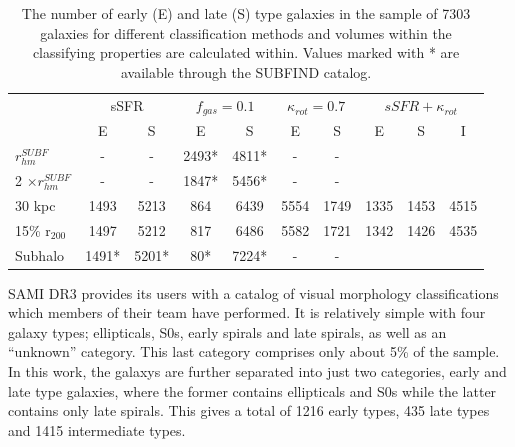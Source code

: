 \begin{table}
\begin{center}
\caption{The number of early (E) and late (S) type galaxies in the sample of 7303 galaxies for different classification methods and volumes within the classifying properties are calculated within. Values marked with * are available through the SUBFIND catalog.}
 \label{morph}
\begin{tabular}{ l| c c c c c c c c c } 
 \hline
 \hline
   &\multicolumn{2}{c}{sSFR}&\multicolumn{2}{c}{$f_{gas} = 0.1$}&\multicolumn{2}{c}{$\kappa_{rot} = 0.7$}&\multicolumn{3}{c}{$sSFR+\kappa_{rot}$}\\
   &  E & S & E & S & E & S & E & S &I  \\
 \hline
 $r_{hm}^{SUBF}$ & - & - & 2493* & 4811* & - & - & & & \\ 
 2 $\times r_{hm}^{SUBF}$ & - & - & 1847* & 5456* & - & - & & & \\ 
 30 kpc & 1493 & 5213 & 864 & 6439 & 5554 & 1749 &1335 & 1453 & 4515 \\ 
 15\% r$_{200}$ & 1497 & 5212 & 817 & 6486 & 5582 & 1721 & 1342 & 1426 & 4535 \\ 
 Subhalo & 1491* & 5201* & 80* & 7224* & - & - & & &\\ 
 \hline 
 \end{tabular}
\end{center}
\end{table}

SAMI DR3 provides its users with a catalog of visual morphology classifications which members of their team have performed. It is relatively simple with four galaxy types; ellipticals, S0s, early spirals and late spirals, as well as an ``unknown'' category. This last category comprises only about 5\% of the sample. In this work, the galaxys are further separated into just two categories, early and late type galaxies, where the former contains ellipticals and S0s while the latter contains only late spirals. This gives a total of 1216 early types, 435 late types and 1415 intermediate types.